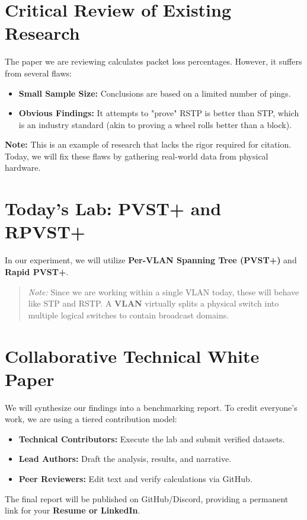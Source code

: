 \documentclass[11pt]{article}
\begin{document}
\section{Critical Review of Existing Research}
The paper we are reviewing calculates packet loss percentages. However, it suffers from several flaws:
\begin{itemize}
    \item \textbf{Small Sample Size:} Conclusions are based on a limited number of pings.
    \item \textbf{Obvious Findings:} It attempts to "prove" RSTP is better than STP, which is an industry standard (akin to proving a wheel rolls better than a block).
\end{itemize}
\textbf{Note:} This is an example of research that lacks the rigor required for citation. Today, we will fix these flaws by gathering real-world data from physical hardware.

\section{Today's Lab: PVST+ and RPVST+}
In our experiment, we will utilize \textbf{Per-VLAN Spanning Tree (PVST+)} and \textbf{Rapid PVST+}. 
\begin{quote}
    \textit{Note:} Since we are working within a single VLAN today, these will behave like STP and RSTP. A \textbf{VLAN} virtually splits a physical switch into multiple logical switches to contain broadcast domains.
\end{quote}

\section{Collaborative Technical White Paper}
We will synthesize our findings into a benchmarking report. To credit everyone’s work, we are using a tiered contribution model:
\begin{itemize}
    \item \textbf{Technical Contributors:} Execute the lab and submit verified datasets.
    \item \textbf{Lead Authors:} Draft the analysis, results, and narrative.
    \item \textbf{Peer Reviewers:} Edit text and verify calculations via GitHub.
\end{itemize}
The final report will be published on GitHub/Discord, providing a permanent link for your \textbf{Resume or LinkedIn}.
\end{document}

